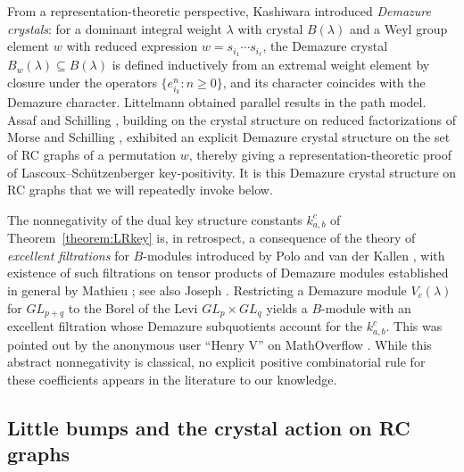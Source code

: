 \documentclass{amsart}
\theoremstyle{definition}
\theoremstyle{remark}
\numberwithin{equation}{subsection}
\begin{document}
From a representation-theoretic perspective, Kashiwara \cite{kashiwara1993crystal} introduced \emph{Demazure crystals}: for a dominant integral weight $\lambda$ with crystal $B(\lambda)$ and a Weyl group element $w$ with reduced expression $w=s_{i_1}\cdots s_{i_\ell}$, the Demazure crystal $B_w(\lambda)\subseteq B(\lambda)$ is defined inductively from an extremal weight element by closure under the operators $\{e_{i_k}^n : n\geq 0\}$, and its character coincides with the Demazure character. Littelmann \cite{littelmann1995crystal} obtained parallel results in the path model. Assaf and Schilling \cite{assaf2018demazure}, building on the crystal structure on reduced factorizations of Morse and Schilling \cite{morse2016crystal}, exhibited an explicit Demazure crystal structure on the set of RC graphs of a permutation $w$, thereby giving a representation-theoretic proof of Lascoux--Schützenberger key-positivity. It is this Demazure crystal structure on RC graphs that we will repeatedly invoke below.

The nonnegativity of the dual key structure constants $k_{a,b}^c$ of Theorem~\ref{theorem:LRkey} is, in retrospect, a consequence of the theory of \emph{excellent filtrations} for $B$-modules introduced by Polo \cite{polo1989excellent} and van der Kallen \cite{vanderkallen1989longest}, with existence of such filtrations on tensor products of Demazure modules established in general by Mathieu \cite{mathieu1990filtrations}; see also Joseph \cite{joseph1985demazure}. Restricting a Demazure module $V_c(\lambda)$ for $GL_{p+q}$ to the Borel of the Levi $GL_p\times GL_q$ yields a $B$-module with an excellent filtration whose Demazure subquotients account for the $k_{a,b}^c$. This was pointed out by the anonymous user ``Henry V'' on MathOverflow \cite{henrymath}. While this abstract nonnegativity is classical, no explicit positive combinatorial rule for these coefficients appears in the literature to our knowledge.

\subsection{Little bumps and the crystal action on RC graphs}
\end{document}

